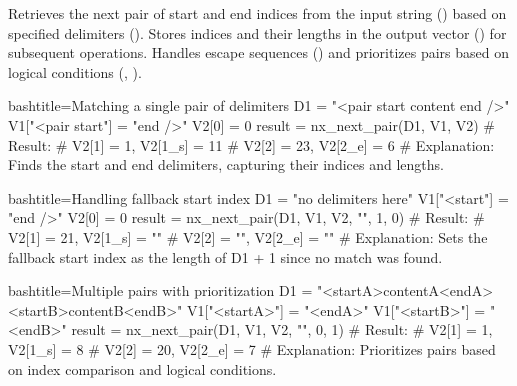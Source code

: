 \begin{NexMainBox}
	\begin{NexMainBox}
		Retrieves the next pair of start and end indices from the input string () based on specified delimiters (). Stores indices and their lengths in the output vector () for subsequent operations. Handles escape sequences () and prioritizes pairs based on logical conditions (, ).
	\end{NexMainBox}
	\begin{NexMainBox}
		\begin{NexListDark}
		\end{NexListDark}
	\end{NexMainBox}
\end{NexMainBox}

\begin{NexCodeBox}{bash}{title={Matching a single pair of delimiters}}
	D1 = "<pair start content end />"
	V1["<pair start"] = "end />"
	V2[0] = 0
	result = nx_next_pair(D1, V1, V2)
	# Result:
	# V2[1] = 1, V2[1_s] = 11
	# V2[2] = 23, V2[2_e] = 6
	# Explanation: Finds the start and end delimiters, capturing their indices and lengths.
\end{NexCodeBox}

\begin{NexCodeBox}{bash}{title={Handling fallback start index}}
	D1 = "no delimiters here"
	V1["<start"] = "end />"
	V2[0] = 0
	result = nx_next_pair(D1, V1, V2, "", 1, 0)
	# Result:
	# V2[1] = 21, V2[1_s] = ""
	# V2[2] = "", V2[2_e] = ""
	# Explanation: Sets the fallback start index as the length of D1 + 1 since no match was found.
\end{NexCodeBox}

\begin{NexCodeBox}{bash}{title={Multiple pairs with prioritization}}
	D1 = "<startA>contentA<endA><startB>contentB<endB>"
	V1["<startA>"] = "<endA>"
	V1["<startB>"] = "<endB>"
	result = nx_next_pair(D1, V1, V2, "", 0, 1)
	# Result:
	# V2[1] = 1, V2[1_s] = 8
	# V2[2] = 20, V2[2_e] = 7
	# Explanation: Prioritizes pairs based on index comparison and logical conditions.
\end{NexCodeBox}

